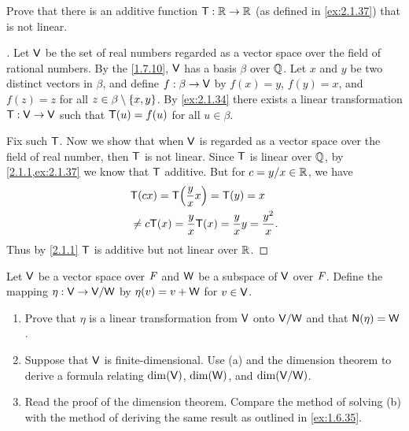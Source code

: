 \begin{ex}\label{ex:2.1.39}
	Prove that there is an additive function \(\mathsf{T} : \mathbb{R} \to \mathbb{R}\) (as defined in \cref{ex:2.1.37}) that is not linear.
\end{ex}

\begin{proof}[]
	Let \(\mathsf{V}\) be the set of real numbers regarded as a vector space over the field of rational numbers.
	By the \cref{1.7.10}, \(\mathsf{V}\) has a basis \(\beta\) over \(\mathbb{Q}\).
	Let \(x\) and \(y\) be two distinct vectors in \(\beta\), and define \(f : \beta \to \mathsf{V}\) by \(f(x) = y\), \(f(y) = x\), and \(f(z) = z\) for all \(z \in \beta \setminus \left\lbrace x, y\right\rbrace\).
	By \cref{ex:2.1.34} there exists a linear transformation \(\mathsf{T} : \mathsf{V} \to \mathsf{V}\) such that \(\mathsf{T}(u) = f(u)\) for all \(u \in \beta\).

	Fix such \(\mathsf{T}\).
	Now we show that when \(\mathsf{V}\) is regarded as a vector space over the field of real number, then \(\mathsf{T}\) is not linear.
	Since \(\mathsf{T}\) is linear over \(\mathbb{Q}\), by \cref{2.1.1,ex:2.1.37} we know that \(\mathsf{T}\) additive.
	But for \(c = y / x \in \mathbb{R}\), we have
	\begin{align*}
		 & \T(cx) = \T\pa{\frac{y}{x} x} = \T(y) = x                         \\
		 & \neq c \T(x) = \frac{y}{x} \T(x) = \frac{y}{x} y = \frac{y^2}{x}.
	\end{align*}
	Thus by \cref{2.1.1} \(\mathsf{T}\) is additive but not linear over \(\mathbb{R}\).
\end{proof}

\begin{ex}\label{ex:2.1.40}
	Let \(\mathsf{V}\) be a vector space over \(\mathit{F}\) and \(\mathsf{W}\) be a subspace of \(\mathsf{V}\) over \(\mathit{F}\).
	Define the mapping \(\eta : \mathsf{V} \to \mathsf{V} / \mathsf{W}\) by \(\eta(v) = v + \mathsf{W}\) for \(v \in \mathsf{V}\).
	\begin{enumerate}
		\item Prove that \(\eta\) is a linear transformation from \(\mathsf{V}\) onto \(\mathsf{V} / \mathsf{W}\) and that \(\ns{\eta} = \W\).
		\item Suppose that \(\mathsf{V}\) is finite-dimensional.
		      Use (a) and the dimension theorem to derive a formula relating \(\dim(\mathsf{V})\), \(\dim(\mathsf{W})\), and \(\dim(\mathsf{V} / \mathsf{W})\).
		\item Read the proof of the dimension theorem.
		      Compare the method of solving (b) with the method of deriving the same result as outlined in \cref{ex:1.6.35}.
	\end{enumerate}
\end{ex}

